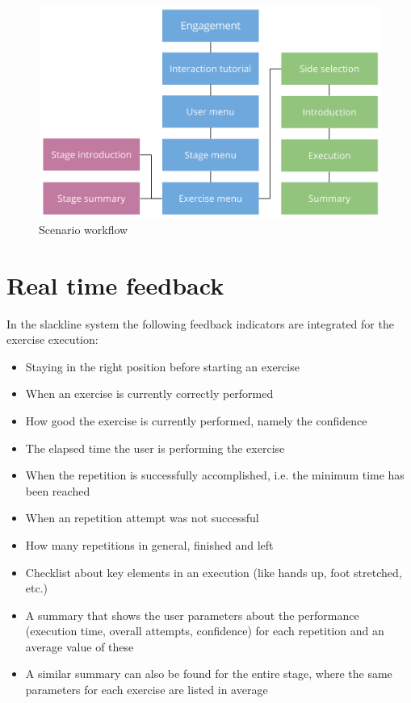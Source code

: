 \begin{figure}[htb]
	\centering
	\begin{minipage}[t]{1\linewidth}
		\centering
		\includegraphics[width=0.8\linewidth]{Pictures/conceptScenarioFlow2}
		\caption{Scenario workflow}
		\label{fig:scenarioWorkflow}
	\end{minipage}
\end{figure}

\section{Real time feedback}

 In the slackline system the following feedback indicators are integrated for the exercise execution:
\begin{itemize}
\item Staying in the right position before starting an exercise
\item When an exercise is currently correctly performed
\item How good the exercise is currently performed, namely the confidence
\item The elapsed time the user is performing the exercise
\item When the repetition is successfully accomplished, i.e. the minimum time has been reached
\item When an repetition attempt was not successful
\item How many repetitions in general, finished and left
\item Checklist about key elements in an execution (like hands up, foot stretched, etc.)
\item A summary that shows the user parameters about the performance (execution time, overall attempts, confidence) for each repetition and an average value of these
\item A similar summary can also be found for the entire stage, where the same parameters for each exercise are listed in average
\end{itemize}

